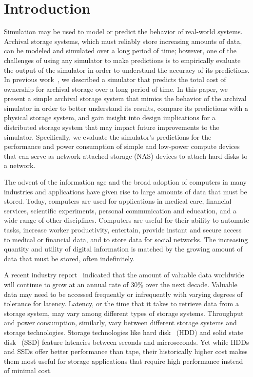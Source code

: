 \section{Introduction}
Simulation may be used to model or predict the behavior of real-world systems.  Archival storage systems, which must reliably store increasing amounts of data, can be modeled and simulated over a long period of time; however, one of the challenges of using any simulator to make predictions is to empirically evaluate the output of the simulator in order to understand the accuracy of its predictions.  In previous work~\cite{byronmaster}, we described a simulator that predicts the total cost of ownership for archival storage over a long period of time.  In this paper, we present a simple archival storage system that mimics the behavior of the archival simulator in order to better understand its results, compare its predictions with a physical storage system, and gain insight into design implications for a distributed storage system that may impact future improvements to the simulator.  Specifically, we evaluate the simulator's predictions for the performance and power consumption of simple and low-power compute devices that can serve as network attached storage (NAS) devices to attach hard disks to a network.

The advent of the information age and the broad adoption of computers in many industries and applications have given rise to large amounts of data that must be stored.  Today, computers are used for applications in medical care, financial services, scientific experiments, personal communication and education, and a wide range of other disciplines.  Computers are useful for their ability to automate tasks, increase worker productivity, entertain, provide instant and secure access to medical or financial data, and to store data for social networks.  The increasing quantity and utility of digital information is matched by the growing amount of data that must be stored, often indefinitely.

A recent industry report~\cite{idc1} indicated that the amount of valuable data worldwide will continue to grow at an annual rate of 30\% over the next decade.  Valuable data may need to be accessed frequently or infrequently with varying degrees of tolerance for latency.  Latency, or the time that it takes to retrieve data from a storage system, may vary among different types of storage systems.  Throughput and power consumption, similarly, vary between different storage systems and storage technologies.  Storage technologies like hard disk~\cite{web41} (HDD) and solid state disk~\cite{web39} (SSD) feature latencies between seconds and microseconds.  Yet while HDDs and SSDs offer better performance than tape, their historically higher cost makes them most useful for storage applications that require high performance instead of minimal cost.

